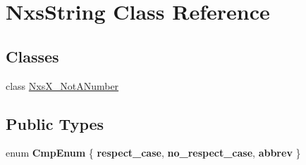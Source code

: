 \hypertarget{classNxsString}{
\section{NxsString Class Reference}
\label{classNxsString}
}
\subsection*{Classes}
\begin{DoxyCompactItemize}
\item 
class \hyperlink{classNxsString_1_1NxsX__NotANumber}{NxsX\_\-NotANumber}
\end{DoxyCompactItemize}
\subsection*{Public Types}
\begin{DoxyCompactItemize}
\item 
enum {\bfseries CmpEnum} \{ {\bfseries respect\_\-case}, 
{\bfseries no\_\-respect\_\-case}, 
{\bfseries abbrev}
 \}
\end{DoxyCompactItemize}
